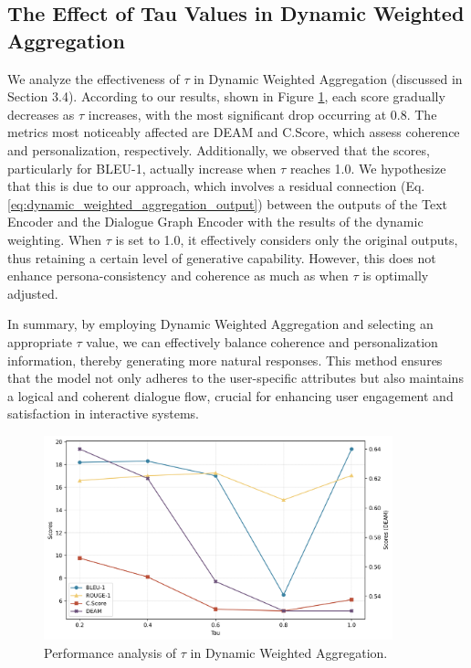 \subsection{The Effect of Tau Values in Dynamic Weighted Aggregation}
We analyze the effectiveness of $\tau$ in Dynamic Weighted Aggregation (discussed in Section 3.4). According to our results, shown in Figure \ref{fig:effectiveness_of_tau}, each score gradually decreases as $\tau$ increases, with the most significant drop occurring at 0.8. The metrics most noticeably affected are DEAM and C.Score, which assess coherence and personalization, respectively. Additionally, we observed that the scores, particularly for BLEU-1, actually increase when $\tau$ reaches 1.0. We hypothesize that this is due to our approach, which involves a residual connection (Eq. \ref{eq:dynamic_weighted_aggregation_output}) between the outputs of the Text Encoder and the Dialogue Graph Encoder with the results of the dynamic weighting. When $\tau$ is set to 1.0, it effectively considers only the original outputs, thus retaining a certain level of generative capability. However, this does not enhance persona-consistency and coherence as much as when $\tau$ is optimally adjusted. 

In summary, by employing Dynamic Weighted Aggregation and selecting an appropriate 
$\tau$ value, we can effectively balance coherence and personalization information, thereby generating more natural responses. This method ensures that the model not only adheres to the user-specific attributes but also maintains a logical and coherent dialogue flow, crucial for enhancing user engagement and satisfaction in interactive systems.

\begin{figure}[H]
    \centering
    \includegraphics[width=0.9\textwidth]{./context/experiment/images/effectiveness_of_tau.png}
    \caption{Performance analysis of $\tau$ in Dynamic Weighted Aggregation.}
    \label{fig:effectiveness_of_tau}
\end{figure}

